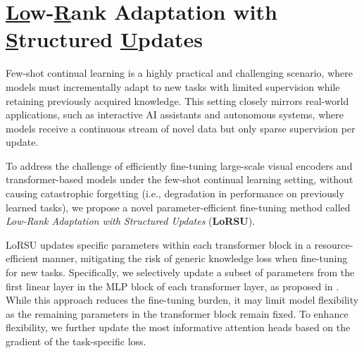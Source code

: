 \section{\texorpdfstring{\underline{Lo}w-\underline{R}ank Adaptation with \underline{S}tructured \underline{U}pdates}{Lg}}\label{sec:lorsu_method}


Few-shot continual learning is a highly practical and challenging scenario, where models must incrementally adapt to new tasks with limited supervision while retaining previously acquired knowledge. This setting closely mirrors real-world applications, such as interactive AI assistants and autonomous systems, where models receive a continuous stream of novel data but only sparse supervision per update.

To address the challenge of efficiently fine-tuning large-scale visual encoders and transformer-based models under the few-shot continual learning setting, without causing catastrophic forgetting (i.e., degradation in performance on previously learned tasks), we propose a novel parameter-efficient fine-tuning method called \emph{Low-Rank Adaptation with Structured Updates} (\textbf{LoRSU}).

LoRSU updates specific parameters within each transformer block in a resource-efficient manner, mitigating the risk of generic knowledge loss when fine-tuning for new tasks. Specifically, we selectively update a subset of parameters from the first linear layer in the MLP block of each transformer layer, as proposed in \cite{zhang2024overcoming}. While this approach reduces the fine-tuning burden, it may limit model flexibility as the remaining parameters in the transformer block remain fixed. To enhance flexibility, we further update the most informative attention heads based on the gradient of the task-specific loss.

